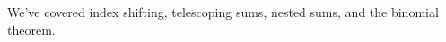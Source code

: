 \documentclass[preview]{standalone}
\begin{document}
\begin{center}
We've covered index shifting, telescoping sums, nested sums, and the binomial theorem.
\end{center}
\end{document}
